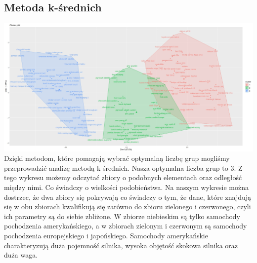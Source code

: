 \documentclass{article}
\begin{document}
    \subsection{Metoda k-średnich}    
        \includegraphics[width = \textwidth]{kmeans_fig}
        Dzięki metodom, które pomagają wybrać optymalną liczbę grup mogliśmy przeprowadzić analizę metodą k-średnich. 
        Nasza optymalna liczba grup to 3. Z tego wykresu możemy odczytać zbiory o podobnych elementach oraz odległość między nimi. 
        Co świadczy o wielkości podobieństwa. Na naszym wykresie można dostrzec, że dwa zbiory się pokrywają co świadczy o tym, że dane, 
        które znajdują się w obu zbiorach kwalifikują się zarówno do zbioru zielonego i czerwonego, czyli ich parametry są do siebie zbliżone.
        \newline\newline
        W zbiorze niebieskim są tylko samochody pochodzenia amerykańskiego, a w zbiorach zielonym i czerwonym są samochody pochodzenia 
        europejskiego i japońskiego. Samochody amerykańskie charakteryzują duża pojemność silnika, wysoka objętość skokowa silnika oraz duża 
        waga. 

        
\end{document}
